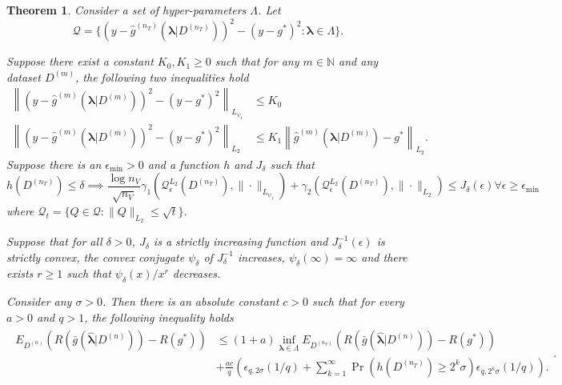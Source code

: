 \documentclass[10pt]{book}
\newtheorem{theorem}{Theorem}
\theoremstyle{definition}
\begin{document}
\begin{theorem}
	\label{thrm:jean_cv}
	Consider a set of hyper-parameters $\Lambda$. Let
	$$
	\mathcal{Q} = \{ 
	\left (y - \hat{g}^{(n_T)}(\boldsymbol{\lambda}|D^{(n_T)}) \right) ^2 
	- \left (y - g^* \right) ^2 
	: \boldsymbol{\lambda} \in \Lambda \}.
	$$
	
	Suppose there exist a constant $K_0, K_1 \ge 0$ such that for any $m \in \mathbb{N}$ and any dataset $D^{(m)}$, the following two inequalities hold
	\begin{align}
	\left \| \left (y - \hat{g}^{(m)}(\boldsymbol{\lambda}|D^{(m)}) \right) ^2 
	- \left (y - g^* \right) ^2  \right \|_{L_{\psi_1}} & \le K_0
	\label{eq:cv_assump1}\\
	\left \| \left (y - \hat{g}^{(m)}(\boldsymbol{\lambda}|D^{(m)}) \right) ^2 
	- \left (y - g^* \right) ^2  \right \|_{L_2} & \le 
	K_1 \left \| \hat{g}^{(m)}(\boldsymbol{\lambda}|D^{(m)}) - g^* \right \|_{L_2}.
	\label{eq:cv_assump2}
	\end{align}
	Suppose there is an $\epsilon_{\min} > 0$ and a function $h$ and $J_\delta$ such that
	\[
	h(D^{(n_{T})})\le\delta\implies\frac{\log n_{V}}{\sqrt{n_{V}}}\gamma_{1}\left(\mathcal{Q}_{\epsilon}^{L_{2}}(D^{(n_{T})}),\|\cdot\|_{L_{\psi_{1}}}\right)+\gamma_{2}\left(\mathcal{Q}_{\epsilon}^{L_{2}}(D^{(n_{T})}),\|\cdot\|_{L_{2}}\right)\le J_{\delta}(\epsilon)\forall\epsilon\ge\epsilon_{\min}
	\]
	where $\mathcal{Q}_t = \{Q \in \mathcal{Q}: \| Q \|_{L_2} \le \sqrt{t} \}$.
	
	Suppose that for all $\delta > 0$, $J_\delta$ is a strictly increasing function and $J_\delta^{-1}(\epsilon)$ is strictly convex,
	the convex conjugate $\psi_\delta$ of $J^{-1}_\delta$ increases, $\psi_\delta(\infty ) = \infty$ and there exists $r \ge 1$ such that $\psi_\delta(x)/x^r$ decreases.
	
	Consider any $\sigma > 0$. Then there is an absolute constant $c > 0$ such that for every $a > 0$ and $q > 1$, the following inequality holds
	\begin{align}
	\begin{split}
	E_{D^{(n)}} 
	\left(
	R\left(\bar{g} ( \hat{\boldsymbol \lambda} | {D^{(n)}} ) \right )
	- R (g^*)
	\right)
	&\le
	(1+a) \inf_{\boldsymbol{\lambda} \in \Lambda} 
	E_{D^{(n_T)}}
	\left(
	R\left(\bar{g} ( \hat{\boldsymbol \lambda} | {D^{(n)}} ) \right )
	- R (g^*)
	\right)
	\\
	& +
	\frac{ac}{q}
	\left(
	\epsilon_{q,2\sigma}(1/q)
	+\sum_{k=1}^{\infty}
	\Pr\left(h\left(D^{(n_{T})}\right)\ge2^{k}\sigma\right)
	\epsilon_{q,2^{k}\sigma}(1/q)
	\right).
	\end{split}.
	\end{align}
\end{theorem}
\end{document}
